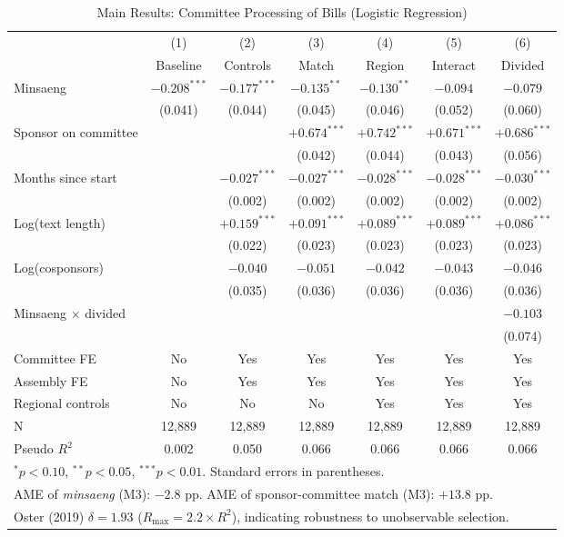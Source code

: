 \documentclass[11pt]{article}
\begin{document}
\begin{table}[htbp]
\centering
\caption{Main Results: Committee Processing of Bills (Logistic Regression)}
\label{tab:main}
\begin{tabular}{lcccccc}
\toprule
& (1) & (2) & (3) & (4) & (5) & (6) \\
& Baseline & Controls & Match & Region & Interact & Divided \\
\midrule
Minsaeng & $-0.208^{***}$ & $-0.177^{***}$ & $-0.135^{**}$ & $-0.130^{**}$ & $-0.094$ & $-0.079$ \\
& (0.041) & (0.044) & (0.045) & (0.046) & (0.052) & (0.060) \\[4pt]
Sponsor on committee & & & $+0.674^{***}$ & $+0.742^{***}$ & $+0.671^{***}$ & $+0.686^{***}$ \\
& & & (0.042) & (0.044) & (0.043) & (0.056) \\[4pt]
Months since start & & $-0.027^{***}$ & $-0.027^{***}$ & $-0.028^{***}$ & $-0.028^{***}$ & $-0.030^{***}$ \\
& & (0.002) & (0.002) & (0.002) & (0.002) & (0.002) \\[4pt]
Log(text length) & & $+0.159^{***}$ & $+0.091^{***}$ & $+0.089^{***}$ & $+0.089^{***}$ & $+0.086^{***}$ \\
& & (0.022) & (0.023) & (0.023) & (0.023) & (0.023) \\[4pt]
Log(cosponsors) & & $-0.040$ & $-0.051$ & $-0.042$ & $-0.043$ & $-0.046$ \\
& & (0.035) & (0.036) & (0.036) & (0.036) & (0.036) \\[4pt]
Minsaeng $\times$ divided & & & & & & $-0.103$ \\
& & & & & & (0.074) \\
\midrule
Committee FE & No & Yes & Yes & Yes & Yes & Yes \\
Assembly FE & No & Yes & Yes & Yes & Yes & Yes \\
Regional controls & No & No & No & Yes & Yes & Yes \\
N & 12,889 & 12,889 & 12,889 & 12,889 & 12,889 & 12,889 \\
Pseudo $R^2$ & 0.002 & 0.050 & 0.066 & 0.066 & 0.066 & 0.066 \\
\bottomrule
\multicolumn{7}{l}{\footnotesize $^{*}p<0.10$, $^{**}p<0.05$, $^{***}p<0.01$. Standard errors in parentheses.} \\
\multicolumn{7}{l}{\footnotesize AME of \emph{minsaeng} (M3): $-2.8$ pp. AME of sponsor-committee match (M3): $+13.8$ pp.} \\
\multicolumn{7}{l}{\footnotesize Oster (2019) $\delta = 1.93$ ($R_{\max} = 2.2 \times R^2$), indicating robustness to unobservable selection.} \\
\end{tabular}
\end{table}
\end{document}
